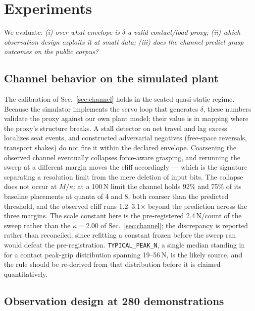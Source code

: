 \documentclass{article}
\begin{document}

\section{Experiments}
\label{sec:experiments}

We evaluate: \emph{(i) over what envelope is $\delta$ a valid
contact/load proxy; (ii) which observation design exploits it at small
data; (iii) does the channel predict grasp outcomes on the public
corpus?}

\subsection{Channel behavior on the simulated plant}
\label{sec:validity}

The calibration of Sec.~\ref{sec:channel} holds in the seated
quasi-static regime. Because the simulator implements the servo loop that
generates $\delta$, these numbers validate the proxy against our own
plant model; their value is in mapping where the proxy's structure
breaks. A stall detector on net travel and lag excess localizes seat
events, and constructed adversarial negatives (free-space reversals,
transport shakes) do not fire it within the declared envelope. Coarsening
the observed channel eventually collapses force-aware grasping, and
rerunning the sweep at a different margin moves the cliff accordingly ---
which is the signature separating a resolution limit from the mere
deletion of input bits. The collapse does not occur at $M / \kappa$: at a
100\,N limit the channel holds 92\% and 75\% of its baseline placements at
quanta of 4 and 8, both coarser than the predicted threshold, and the
observed cliff runs 1.2--3.1$\times$ beyond the prediction across the
three margins. The scale constant here is the pre-registered
2.4\,N/count of the sweep rather than the $\kappa = 2.00$ of
Sec.~\ref{sec:channel}; the discrepancy is reported rather than
reconciled, since refitting a constant frozen before the sweep ran would
defeat the pre-registration. \texttt{TYPICAL\_PEAK\_N}, a single median
standing in for a contact peak-grip distribution spanning 19--56\,N, is
the likely source, and the rule should be re-derived from that
distribution before it is claimed quantitatively.

\subsection{Observation design at 280 demonstrations}
\label{sec:grid}
\end{document}

